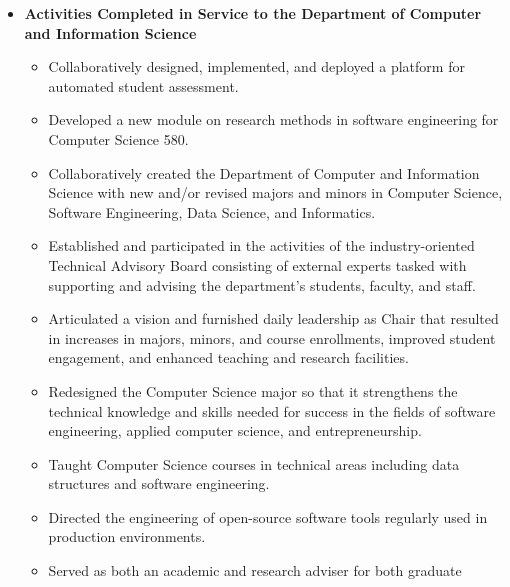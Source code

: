 \documentclass[11pt,letterpaper,sans]{moderncv}
\begin{document}
 {
  \begin{itemize} \renewcommand\labelitemi{\Large\textbullet}
    \item \textbf{Activities Completed in Service to the Department of Computer
      and Information Science}
      \begin{itemize} \renewcommand\labelitemi{\Large\textbullet}
        \item Collaboratively designed, implemented, and deployed a
          platform for automated student assessment.
        \item Developed a new module on research methods in software
          engineering for Computer Science 580.
        \item Collaboratively created the Department of Computer and Information
          Science with new and/or revised majors and minors in Computer Science,
          Software Engineering, Data Science, and Informatics.
        \item Established and participated in the activities of the
          industry-oriented Technical Advisory Board consisting of external
          experts tasked with supporting and advising the department's students,
          faculty, and staff.
        \item Articulated a vision and furnished daily leadership as Chair that
          resulted in increases in majors, minors, and course enrollments,
          improved student engagement, and enhanced teaching and research
          facilities.
        \item Redesigned the Computer Science major so that it strengthens the
          technical knowledge and skills needed for success in the fields of
          software engineering, applied computer science, and entrepreneurship.
        \item Taught Computer Science courses in technical areas including data
          structures and software engineering.
        \item Directed the engineering of open-source software tools regularly
          used in production environments.
        \item Served as both an academic and research adviser for both graduate

\end{itemize}
\end{itemize}}
\end{document}
